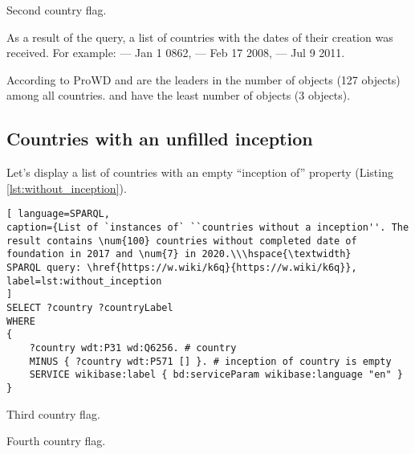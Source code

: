 \begin{marginfigure}[3.2cm]
	{
		\setlength{\fboxsep}{0pt}%
		\setlength{\fboxrule}{1pt}%
	}
	\caption{Second country flag.}%
	\label{fig:flag_mongolia}%
\end{marginfigure}

As a result of the query, a list of countries with the dates of their creation was received. For example:  --- Jan 1 0862,  --- Feb 17 2008,  --- Jul 9 2011.

According to ProWD  and  are the leaders in the number of objects (127 objects) among all countries.  and  have the least number of objects (3 objects).


\subsection{Countries with an unfilled inception}

Let's display a list of countries with an empty ``inception of'' property (Listing \ref{lst:without_inception}).

\begin{lstlisting}[ language=SPARQL, 
caption={List of `instances of` ``countries without a inception''. The result contains \num{100} countries without completed date of foundation in 2017 and \num{7} in 2020.\\\hspace{\textwidth}
SPARQL query: \href{https://w.wiki/k6q}{https://w.wiki/k6q}},
label=lst:without_inception
]
SELECT ?country ?countryLabel 
WHERE
{
	?country wdt:P31 wd:Q6256. # country
	MINUS { ?country wdt:P571 [] }. # inception of country is empty
	SERVICE wikibase:label { bd:serviceParam wikibase:language "en" }
}
\end{lstlisting}

\begin{marginfigure}[-1.6cm]
	{
		\setlength{\fboxsep}{0pt}%
		\setlength{\fboxrule}{1pt}%
	}
	\caption{Third country flag.}%
	\label{fig:flag_singapore}%
\end{marginfigure}

\begin{marginfigure}[2.4cm]
	{
		\setlength{\fboxsep}{0pt}%
		\setlength{\fboxrule}{1pt}%
	}
	\caption{Fourth country flag.}%
	\label{fig:flag_israel}%
\end{marginfigure}


